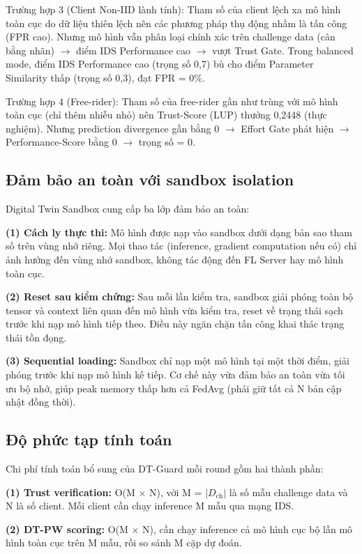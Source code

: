 Trường hợp 3 (Client Non-IID lành tính): Tham số của client lệch xa mô hình toàn cục do dữ liệu thiên lệch nên các phương pháp thụ động nhầm là tấn công (FPR cao). Nhưng mô hình vẫn phân loại chính xác trên challenge data (cân bằng nhãn) $\rightarrow$ điểm IDS Performance cao $\rightarrow$ vượt Trust Gate. Trong balanced mode, điểm IDS Performance cao (trọng số 0,7) bù cho điểm Parameter Similarity thấp (trọng số 0,3), đạt FPR = 0\%.

Trường hợp 4 (Free-rider): Tham số của free-rider gần như trùng với mô hình toàn cục (chỉ thêm nhiễu nhỏ) nên Trust-Score (LUP) thưởng 0,2448 (thực nghiệm). Nhưng prediction divergence gần bằng 0 $\rightarrow$ Effort Gate phát hiện $\rightarrow$ Performance-Score bằng 0 $\rightarrow$ trọng số = 0.

\subsection{Đảm bảo an toàn với sandbox isolation}
Digital Twin Sandbox cung cấp ba lớp đảm bảo an toàn:

\textbf{(1) Cách ly thực thi:} Mô hình được nạp vào sandbox dưới dạng bản sao tham số trên vùng nhớ riêng. Mọi thao tác (inference, gradient computation nếu có) chỉ ảnh hưởng đến vùng nhớ sandbox, không tác động đến FL Server hay mô hình toàn cục.

\textbf{(2) Reset sau kiểm chứng:} Sau mỗi lần kiểm tra, sandbox giải phóng toàn bộ tensor và context liên quan đến mô hình vừa kiểm tra, reset về trạng thái sạch trước khi nạp mô hình tiếp theo. Điều này ngăn chặn tấn công khai thác trạng thái tồn đọng.

\textbf{(3) Sequential loading:} Sandbox chỉ nạp một mô hình tại một thời điểm, giải phóng trước khi nạp mô hình kế tiếp. Cơ chế này vừa đảm bảo an toàn vừa tối ưu bộ nhớ, giúp peak memory thấp hơn cả FedAvg (phải giữ tất cả N bản cập nhật đồng thời).

\subsection{Độ phức tạp tính toán}
Chi phí tính toán bổ sung của DT-Guard mỗi round gồm hai thành phần:

\textbf{(1) Trust verification:} O(M $\times$ N), với M = $|D_{\text{ch}}|$ là số mẫu challenge data và N là số client. Mỗi client cần chạy inference M mẫu qua mạng IDS.

\textbf{(2) DT-PW scoring:} O(M $\times$ N), cần chạy inference cả mô hình cục bộ lẫn mô hình toàn cục trên M mẫu, rồi so sánh M cặp dự đoán.

